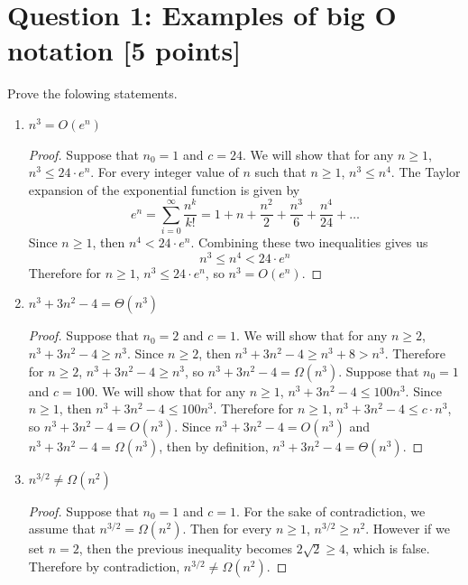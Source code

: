 \documentclass{report}
\theoremstyle{mytheoremstyle}
\theoremstyle{mytheoremstyle}
\theoremstyle{myproblemstyle}
\begin{document}
\section*{Question 1: Examples of big O notation [5 points]}
Prove the folowing statements.
\begin{enumerate}
    \item $n^3=O(e^n)$
        \begin{proof}
            Suppose that $n_0 = 1$ and $c = 24$. We will show that for any $n \geq 1$, $n^3 \leq 24\cdot e^n$. For every integer value of $n$ such that $n \geq 1$, $n^3 \leq n^4.$ The Taylor expansion of the exponential function is given by $$e^n=\sum_{i=0}^{\infty} \frac{n^k}{k!}=1+n+\frac{n^2}{2}+\frac{n^3}{6}+\frac{n^4}{24}+\ldots$$ Since $n \geq 1$, then $n^4 < 24\cdot e^n$. Combining these two inequalities gives us $$n^3 \leq n^4 < 24\cdot e^n$$ Therefore for $n \geq 1$, $n^3 \leq 24\cdot e^n$, so $n^3 = O(e^n)$.
        \end{proof}
    \item $n^3+3n^2-4=\Theta(n^3)$
        \begin{proof}
            Suppose that $n_0 = 2$ and $c = 1$. We will show that for any $n \geq 2$, $n^3+3n^2-4 \geq n^3$. Since $n \geq 2$, then $n^3 + 3n^2 - 4 \geq n^3 + 8 > n^3$. Therefore for $n \geq 2$, $n^3+3n^2-4 \geq n^3$, so $n^3+3n^2-4=\Omega (n^3)$. Suppose that $n_0 = 1$ and $c = 100$. We will show that for any $n \geq 1$, $n^3+3n^2-4 \leq 100n^3$. Since $n \geq 1$, then $n^3+3n^2-4 \leq 100n^3$. Therefore for $n \geq 1$, $n^3 + 3n^2 - 4 \leq c\cdot n^3$, so $n^3+3n^2-4=O(n^3)$. Since $n^3+3n^2-4=O(n^3)$ and $n^3+3n^2-4=\Omega(n^3)$, then by definition, $n^3+3n^2-4=\Theta(n^3)$.
        \end{proof}
    \item $n^{3/2} \neq \Omega(n^2)$
        \begin{proof}
            Suppose that $n_0 = 1$ and $c = 1$. For the sake of contradiction, we assume that $n^{3/2} = \Omega(n^2)$. Then for every $n \geq 1$, $n^{3/2} \geq n^2$. However if we set $n = 2$, then the previous inequality becomes $2\sqrt{2} \geq 4$, which is false. Therefore by contradiction, $n^{3/2} \neq \Omega(n^2)$.
        \end{proof}
\end{enumerate}
\newpage
\end{document}
